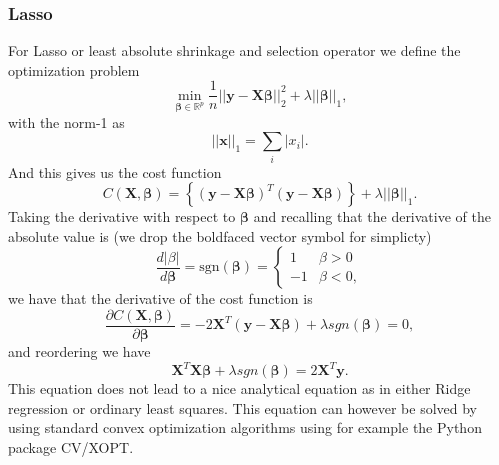 \subsubsection{Lasso}
For Lasso or least absolute shrinkage and selection operator we define the optimization problem
$$
{\displaystyle \min_{\boldsymbol{\beta}\in
{\mathbb{R}}^{p}}}\frac{1}{n}\vert\vert \boldsymbol{y}-\boldsymbol{X}\boldsymbol{\beta}\vert\vert_2^2+\lambda\vert\vert \boldsymbol{\beta}\vert\vert_1,
$$
with the norm-1 as
$$
\vert\vert \boldsymbol{x}\vert\vert_1 = \sum_i \vert x_i\vert.
$$
And this gives us the cost function 
$$
C(\boldsymbol{X},\boldsymbol{\beta})=\left\{(\boldsymbol{y}-\boldsymbol{X}\boldsymbol{\beta})^T(\boldsymbol{y}-\boldsymbol{X}\boldsymbol{\beta})\right\}+\lambda\vert\vert\boldsymbol{\beta}\vert\vert_1.
$$
Taking the derivative with respect to $\boldsymbol{\beta}$ and recalling that the derivative of the absolute value is (we drop the boldfaced vector symbol for simplicty)
$$
\frac{d \vert \beta\vert}{d \boldsymbol{\beta}}=\mathrm{sgn}(\boldsymbol{\beta})=\left\{\begin{array}{cc} 1 & \beta > 0 \\-1 & \beta < 0, \end{array}\right.
$$
we have that the derivative of the cost function is
$$
\frac{\partial C(\boldsymbol{X},\boldsymbol{\beta})}{\partial \boldsymbol{\beta}}=-2\boldsymbol{X}^T(\boldsymbol{y}-\boldsymbol{X}\boldsymbol{\beta})+\lambda sgn(\boldsymbol{\beta})=0,
$$
and reordering we have
$$
\boldsymbol{X}^T\boldsymbol{X}\boldsymbol{\beta}+\lambda sgn(\boldsymbol{\beta})=2\boldsymbol{X}^T\boldsymbol{y}.
$$
This equation does not lead to a nice analytical equation as in either Ridge regression or ordinary least squares. This equation can however be solved by using standard convex optimization algorithms using for example the Python package CV\slash XOPT.





